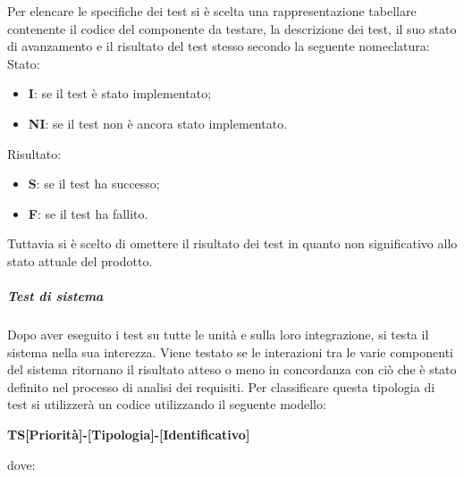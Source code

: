                 Per elencare le specifiche dei test si è scelta una rappresentazione tabellare contenente il codice del componente da testare, la descrizione dei test, il suo stato di avanzamento e il risultato del test stesso secondo la seguente nomeclatura: \\
                Stato:
                \begin{itemize}
                    \item \textbf{I}: se il test è stato implementato;
                    \item \textbf{NI}: se il test non è ancora stato implementato.     
                \end{itemize}
                Risultato:
                \begin{itemize}
                    \item \textbf{S}: se il test ha successo;
                    \item \textbf{F}: se il test ha fallito.
                \end{itemize}
                Tuttavia si è scelto di omettere il risultato dei test in quanto non significativo allo stato attuale del prodotto.


            \subparagraph*{Test di sistema}
                Dopo aver eseguito i test su tutte le unità e sulla loro integrazione, si testa il sistema nella sua interezza. Viene testato se le interazioni tra le varie componenti del sistema ritornano il risultato atteso o meno in concordanza con ciò che è stato definito nel processo di analisi dei requisiti.
                Per classificare questa tipologia di test si utilizzerà un codice utilizzando il seguente modello:     

                \begin{center}
                \textbf{TS[Priorità]-[Tipologia]-[Identificativo]}
                \end{center}
                dove: 
                
